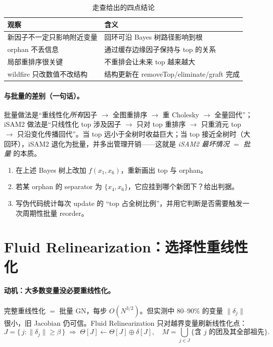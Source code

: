 \begin{table}[H]\centering\small
\caption{走查给出的四点结论}
\label{tab:worked-lessons}
\begin{tabular}{ll}
\toprule
观察 & 含义 \\
\midrule
新因子不一定只影响附近变量 & 回环可沿 Bayes 树路径影响到根 \\
orphan 不丢信息 & 通过缓存边缘因子保持与 top 的关系 \\
局部重排序很关键 & 不重排会让未来 top 越来越大 \\
wildfire 只改数值不改结构 & 结构更新在 removeTop/eliminate/graft 完成 \\
\bottomrule
\end{tabular}
\end{table}

\paragraph{与批量的差别（一句话）。}
批量做法是“重线性化\emph{所有}因子 $\to$ 全图重排序 $\to$ 重 Cholesky $\to$ 全量回代”；iSAM2 做法是“只线性化 top 涉及因子 $\to$ 只对 top 重排序 $\to$ 只重消元 top $\to$ 只沿变化传播回代”。当 top 远小于全树时收益巨大；当 top 接近全树时（大回环），iSAM2 退化为批量，并多出管理开销——这就是 \emph{iSAM2 最坏情况 $=$ 批量} 的本质。

\begin{practice}
\begin{enumerate}
  \item 在上述 Bayes 树上改加 $f(x_1,x_6)$，重新画出 top 与 orphan。
  \item 若某 orphan 的 separator 为 $\{x_4,x_6\}$，它应挂到哪个新团下？给出判据。
  \item 写伪代码统计每次 update 的 “top 占全树比例”，并用它判断是否需要触发一次周期性批量 reorder。
\end{enumerate}
\end{practice}

\section{Fluid Relinearization：选择性重线性化}
\label{sec:isam-fluid}

\paragraph{动机：大多数变量没必要重线性化。}
完整重线性化 $=$ 批量 GN，每步 $O(N^{3/2})$。但实测中 $80$--$90\%$ 的变量 $\|\delta_j\|$ 很小，旧 Jacobian 仍可信。Fluid Relinearization 只对越界变量刷新线性化点\cite{kaess2012isam2}：
\begin{equation}
  J=\{\,j:\|\delta_j\|\ge\beta\,\}\;\Rightarrow\;
  \Theta[J]\leftarrow\Theta[J]\oplus\delta[J],\quad
  M=\bigcup_{j\in J}\{\text{含 }j\text{ 的团及其全部祖先}\}.
  \label{eq:fluid-relin}
\end{equation}

